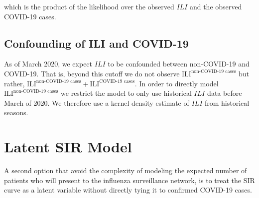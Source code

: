 \documentclass{article}
\begin{document}
which is the product of the likelihood over the observed $ILI$ and the observed COVID-19 cases. 

\subsection{Confounding of ILI and COVID-19}

As of March 2020, we expect $ILI$ to be confounded between non-COVID-19 and COVID-19. That is, beyond this cutoff we do not observe $\text{ILI}^{\text{non-COVID-19 cases}}$ but rather, $\text{ILI}^{\text{non-COVID-19 cases}} + \text{ILI}^{\text{COVID-19 cases}}$. In order to directly model $\text{ILI}^{\text{non-COVID-19 cases}}$ we restrict the model to only use historical $ILI$ data before March of 2020. We therefore use a kernel density estimate of $ILI$ from historical seasons.

\section{Latent SIR Model}

A second option that avoid the complexity of modeling the expected number of patients who will present to the influenza surveillance network, is to treat the SIR curve as a latent variable without directly tying it to confirmed COVID-19 cases. 
\end{document}
